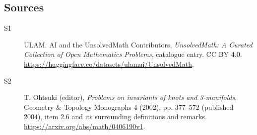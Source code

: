 \documentclass[11pt]{article}
\begin{document}
\subsection{Sources}
\begin{description}
\item[\hypertarget{source:statement:1}{S1}] ULAM. AI and the UnsolvedMath Contributors, \emph{UnsolvedMath: A Curated Collection of Open Mathematics Problems}, catalogue entry. CC BY 4.0. \url{https://huggingface.co/datasets/ulamai/UnsolvedMath}.
\item[\hypertarget{source:statement:2}{S2}] T. Ohtsuki (editor), \emph{Problems on invariants of knots and 3-manifolds}, Geometry \& Topology Monographs 4 (2002), pp. 377--572 (published 2004), item 2.6 and its surrounding definitions and remarks. \url{https://arxiv.org/abs/math/0406190v1}.
\end{description}
\label{end:statement}
\end{document}
